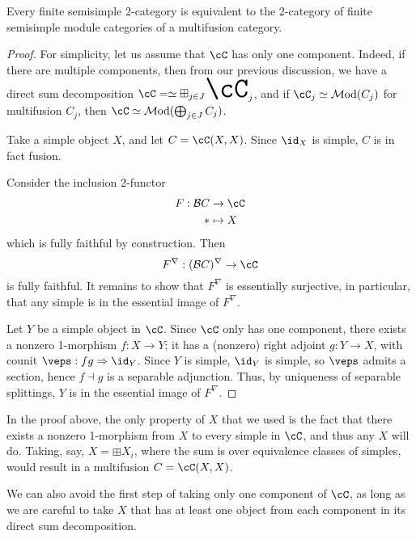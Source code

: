 \documentclass[12pt]{article}
\newcommand{\cB}{{\mathcal{B}}}
\newcommand{\Mod}{{\mathcal{M}\textrm{od}}}
\newcommand{\bigboxplus}{\Huge \boxplus}
\newcommand{\ModA}[1]{{\Mod(#1)}}
\begin{document}
\begin{theorem}
Every finite semisimple 2-category is equivalent to
the 2-category of finite semisimple module categories
of a multifusion category.
\end{theorem}

\begin{proof}
For simplicity, let us assume that $\cC$ has only one component.
Indeed, if there are multiple components,
then from our previous discussion,
we have a direct sum decomposition
$\cC =\simeq \bigboxplus_{j \in J} \cC_j$,
and if $\cC_j \simeq \ModA{C_j}$ for multifusion $C_j$,
then $\cC \simeq \ModA{\bigoplus_{j \in J} C_j}$.

Take a simple object $X$,
and let $C = \cC(X,X)$.
Since $\id_X$ is simple, $C$ is in fact fusion.

Consider the inclusion 2-functor
\begin{align*}
F : \cB C &\to \cC
\\
* &\mapsto X
\end{align*}
which is fully faithful by construction.
Then
\[
F^\nabla: (\cB C)^\nabla \to \cC
\]
is fully faithful.
It remains to show that $F^\nabla$ is essentially surjective,
in particular, that any simple is in the essential image
of $F^\nabla$.

Let $Y$ be a simple object in $\cC$.
Since $\cC$ only has one component,
there exists a nonzero 1-morphism
$f: X \to Y$;
it has a (nonzero) right adjoint $g: Y \to X$,
with counit $\veps : fg \Rightarrow \id_Y$.
Since $Y$ is simple, $\id_Y$ is simple,
so $\veps$ admits a section,
hence $f \dashv g$ is a separable adjunction.
Thus, by uniqueness of separable splittings,
$Y$ is in the essential image of $F^\nabla$.
\end{proof}


In the proof above,
the only property of $X$ that we used is the fact that
there exists a nonzero 1-morphism from $X$ to every simple
in $\cC$,
and thus any $X$ will do.
Taking, say, $X = \boxplus X_i$,
where the sum is over equivalence classes of simples,
would result in a multifusion $C = \cC(X,X)$.

We can also avoid the first step of taking only one component
of $\cC$,
as long as we are careful to take $X$
that has at least one object from each component
in its direct sum decomposition.
\end{document}
